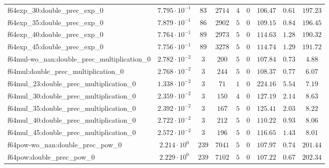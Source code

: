\begin{tabular}{|l|c|c|c|c|c|c|c|c|}
f64exp\_30:double\_prec\_exp\_0                & $ 7.795 \cdot 10^{-1} $ & $ 83     $ & $ 2714  $ & $ 4   $ & $ 0      $ & $ 106.47      $ & $ 0.61    $ & $ 197.23  $ \\
f64exp\_35:double\_prec\_exp\_0                & $ 7.879 \cdot 10^{-1} $ & $ 86     $ & $ 2902  $ & $ 5   $ & $ 0      $ & $ 109.15      $ & $ 0.84    $ & $ 196.45  $ \\
f64exp\_40:double\_prec\_exp\_0                & $ 7.764 \cdot 10^{-1} $ & $ 89     $ & $ 2973  $ & $ 5   $ & $ 0      $ & $ 114.63      $ & $ 1.28    $ & $ 190.32  $ \\
f64exp\_45:double\_prec\_exp\_0                & $ 7.756 \cdot 10^{-1} $ & $ 89     $ & $ 3278  $ & $ 5   $ & $ 0      $ & $ 114.74      $ & $ 1.29    $ & $ 191.72  $ \\
f64mul-wo\_nan:double\_prec\_multiplication\_0 & $ 2.782 \cdot 10^{-2} $ & $ 3      $ & $ 200   $ & $ 5   $ & $ 0      $ & $ 107.84      $ & $ 0.73    $ & $ 4.88    $ \\
f64mul:double\_prec\_multiplication\_0         & $ 2.768 \cdot 10^{-2} $ & $ 3      $ & $ 244   $ & $ 5   $ & $ 0      $ & $ 108.37      $ & $ 0.77    $ & $ 6.07    $ \\
f64mul\_23:double\_prec\_multiplication\_0     & $ 1.338 \cdot 10^{-2} $ & $ 3      $ & $ 71    $ & $ 1   $ & $ 0      $ & $ 224.16      $ & $ 5.54    $ & $ 7.19    $ \\
f64mul\_30:double\_prec\_multiplication\_0     & $ 2.359 \cdot 10^{-2} $ & $ 3      $ & $ 150   $ & $ 4   $ & $ 0      $ & $ 127.19      $ & $ 2.14    $ & $ 8.63    $ \\
f64mul\_35:double\_prec\_multiplication\_0     & $ 2.392 \cdot 10^{-2} $ & $ 3      $ & $ 167   $ & $ 5   $ & $ 0      $ & $ 125.41      $ & $ 2.03    $ & $ 8.22    $ \\
f64mul\_40:double\_prec\_multiplication\_0     & $ 2.722 \cdot 10^{-2} $ & $ 3      $ & $ 212   $ & $ 5   $ & $ 0      $ & $ 110.22      $ & $ 0.93    $ & $ 8.06    $ \\
f64mul\_45:double\_prec\_multiplication\_0     & $ 2.572 \cdot 10^{-2} $ & $ 3      $ & $ 196   $ & $ 5   $ & $ 0      $ & $ 116.65      $ & $ 1.43    $ & $ 8.01    $ \\
f64pow-wo\_nan:double\_prec\_pow\_0            & $ 2.214 \cdot 10^{0}  $ & $ 239    $ & $ 7041  $ & $ 5   $ & $ 0      $ & $ 107.97      $ & $ 0.74    $ & $ 201.44  $ \\
f64pow:double\_prec\_pow\_0                    & $ 2.229 \cdot 10^{0}  $ & $ 239    $ & $ 7102  $ & $ 5   $ & $ 0      $ & $ 107.22      $ & $ 0.67    $ & $ 202.34  $ \\

\end{tabular}
